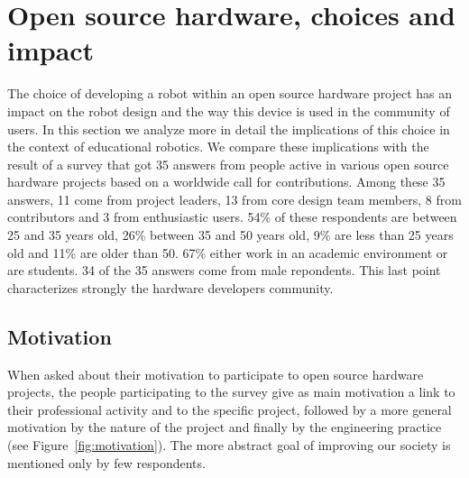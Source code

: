 \documentclass[letterpaper, 10 pt, conference]{ieeeconf}  %
\begin{document}
\section{Open source hardware, choices and impact}

The choice of developing a robot within an open source hardware project has an impact on the robot design and the way this device is used in the community of users. 
In this section we analyze more in detail the implications of this choice in the context of educational robotics.
We compare these implications with the result of a survey that got 35 answers from people active in various open source hardware projects based on a worldwide call for contributions. 
Among these 35 answers, 11 come from project leaders, 13 from core design team members, 8 from contributors and 3 from enthusiastic users.
54\% of these respondents are between 25 and 35 years old, 26\% between 35 and 50 years old, 9\% are less than 25 years old and 11\% are older than 50.  
67\% either work in an academic environment or are students. 
34 of the 35 answers come from male repondents.
This last point characterizes strongly the hardware developers community. 

\subsection{Motivation}

When asked about their motivation to participate to open source hardware projects, the people participating to the survey give as main motivation a link to their professional activity and to the specific project, followed by a more general motivation by the nature of the project and finally by the engineering practice (see Figure~\ref{fig:motivation}). 
The more abstract goal of improving our society is mentioned only by few respondents.
\end{document}
